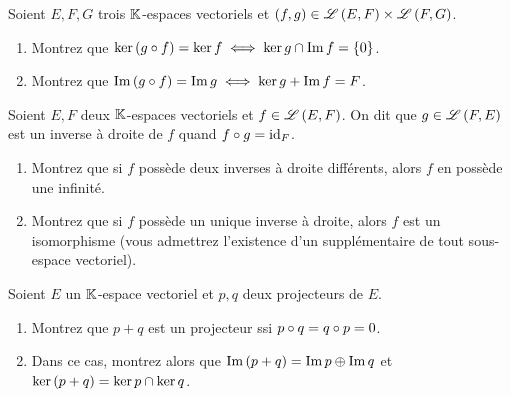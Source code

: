 \begin{corr}
\end{corr}

\begin{exopss}[Exercice 10]
Soient \(E,F,G\) trois \(\mathbb{K}\)-espaces vectoriels et \(\left(f,g\right)\in\mathscr{L}\left(E,F\right)\times\mathscr{L}\left(F,G\right)\).

\begin{enumerate}
    \item Montrez que \(\ker\left(g\circ f\right)=\ker f\iff\ker g\cap\operatorname{Im} f=\left\lbrace0\right\rbrace\). \\
    \item Montrez que \(\operatorname{Im}\left(g\circ f\right)=\operatorname{Im} g\iff\ker g+\operatorname{Im} f=F\).
\end{enumerate}
\end{exopss}

\begin{corr}
\end{corr}

\begin{exosss}[Exercice 11]
Soient \(E,F\) deux \(\mathbb{K}\)-espaces vectoriels et \(f\in\mathscr{L}\left(E,F\right)\). On dit que \(g\in\mathscr{L}\left(F,E\right)\) est un inverse à droite de \(f\) quand \(f\circ g=\mathrm{id}_{F}\).

\begin{enumerate}
    \item Montrez que si \(f\) possède deux inverses à droite différents, alors \(f\) en possède une infinité. \\
    \item Montrez que si \(f\) possède un unique inverse à droite, alors \(f\) est un isomorphisme (vous admettrez l'existence d'un supplémentaire de tout sous-espace vectoriel).
\end{enumerate}
\end{exosss}

\begin{corr}
\end{corr}

\begin{exopss}[Exercice 12]
Soient \(E\) un \(\mathbb{K}\)-espace vectoriel et \(p,q\) deux projecteurs de \(E\).

\begin{enumerate}
    \item Montrez que \(p+q\) est un projecteur ssi \(p\circ q=q\circ p=0\). \\
    \item Dans ce cas, montrez alors que \(\operatorname{Im}\left(p+q\right)=\operatorname{Im} p\oplus\operatorname{Im} q\) et \(\ker\left(p+q\right)=\ker p\cap\ker q\).
\end{enumerate}
\end{exopss}

